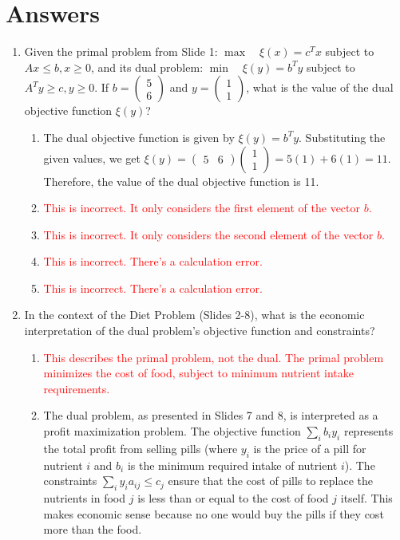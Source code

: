 \documentclass{article}%
\newcommand{\incorrect}[1]{\textcolor{red}{#1}}
\begin{document}
\section{Answers}%
\label{sec:Answers}%
\begin{enumerate}%
\item Given the primal problem from Slide 1: $\max \quad \xi(x) = c^T x$ subject to $Ax \le b, x \ge 0$, and its dual problem: $\min \quad \xi(y) = b^T y$ subject to $A^T y \ge c, y \ge 0$. If $b = \begin{pmatrix} 5 \\ 6 \end{pmatrix}$ and $y = \begin{pmatrix} 1 \\ 1 \end{pmatrix}$, what is the value of the dual objective function $\xi(y)$?%
\begin{enumerate}%
\item The dual objective function is given by $\xi(y) = b^T y$. Substituting the given values, we get $\xi(y) = \begin{pmatrix} 5 & 6 \end{pmatrix} \begin{pmatrix} 1 \\ 1 \end{pmatrix} = 5(1) + 6(1) = 11$. Therefore, the value of the dual objective function is 11.%
\item \incorrect{This is incorrect. It only considers the first element of the vector $b$.}%
\item \incorrect{This is incorrect. It only considers the second element of the vector $b$.}%
\item \incorrect{This is incorrect. There's a calculation error.}%
\item \incorrect{This is incorrect. There's a calculation error.}%
\end{enumerate}%
\vspace{1em}%
\item In the context of the Diet Problem (Slides 2-8), what is the economic interpretation of the dual problem's objective function and constraints?%
\begin{enumerate}%
\item \incorrect{This describes the primal problem, not the dual. The primal problem minimizes the cost of food, subject to minimum nutrient intake requirements.}%
\item The dual problem, as presented in Slides 7 and 8, is interpreted as a profit maximization problem.  The objective function $\sum_i b_i y_i$ represents the total profit from selling pills (where $y_i$ is the price of a pill for nutrient $i$ and $b_i$ is the minimum required intake of nutrient $i$). The constraints $\sum_i y_i a_{ij} \le c_j$ ensure that the cost of pills to replace the nutrients in food $j$ is less than or equal to the cost of food $j$ itself. This makes economic sense because no one would buy the pills if they cost more than the food.%

\end{enumerate}
\end{enumerate}
\end{document}
